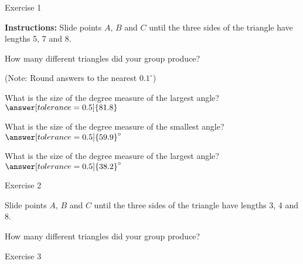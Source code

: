 \documentclass[number]{ximera}
\begin{document}
Exercise 1

{\bf {Instructions:}} Slide points $A$, $B$ and $C$ until the three sides of the triangle have lengths 5, 7 and 8. 

\begin{question}
How many different triangles did your group produce?
\begin{multipleChoice}
\end{multipleChoice}
\begin{question}
(Note: Round answers to the nearest $0.1^\circ$)

What is the size of the degree measure of the largest angle? $\answer[tolerance=0.5]{81.8}$

What is the size of the degree measure of the smallest angle? $\answer[tolerance=0.5]{59.9}^\circ$

What is the size of the degree measure of the largest angle? $\answer[tolerance=0.5]{38.2}^\circ$
\end{question}
\end{question}

\bigskip


Exercise 2

Slide points $A$, $B$ and $C$ until the three sides of the triangle have lengths 3, 4 and 8. 

\begin{question}
How many different triangles did your group produce?
\begin{multipleChoice}
\end{multipleChoice}

\end{question}

\bigskip


Exercise 3
\end{document}

